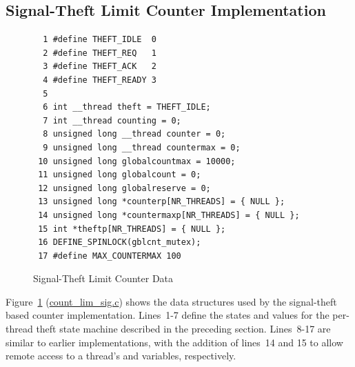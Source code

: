 \subsection{Signal-Theft Limit Counter Implementation}
\label{sec:count:Signal-Theft Limit Counter Implementation}

\begin{figure}[tbp]
{ \scriptsize
\begin{verbatim}
  1 #define THEFT_IDLE  0
  2 #define THEFT_REQ   1
  3 #define THEFT_ACK   2
  4 #define THEFT_READY 3
  5 
  6 int __thread theft = THEFT_IDLE;
  7 int __thread counting = 0;
  8 unsigned long __thread counter = 0;
  9 unsigned long __thread countermax = 0;
 10 unsigned long globalcountmax = 10000;
 11 unsigned long globalcount = 0;
 12 unsigned long globalreserve = 0;
 13 unsigned long *counterp[NR_THREADS] = { NULL };
 14 unsigned long *countermaxp[NR_THREADS] = { NULL };
 15 int *theftp[NR_THREADS] = { NULL };
 16 DEFINE_SPINLOCK(gblcnt_mutex);
 17 #define MAX_COUNTERMAX 100
\end{verbatim}
}
\caption{Signal-Theft Limit Counter Data}
\label{fig:count:Signal-Theft Limit Counter Data}
\end{figure}

Figure~\ref{fig:count:Signal-Theft Limit Counter Data}
(\url{count_lim_sig.c})
shows the data structures used by the signal-theft based counter
implementation.
Lines~1-7 define the states and values for the per-thread theft state machine
described in the preceding section.
Lines~8-17 are similar to earlier implementations, with the addition of
lines~14 and 15 to allow remote access to a thread's 
and  variables, respectively.

